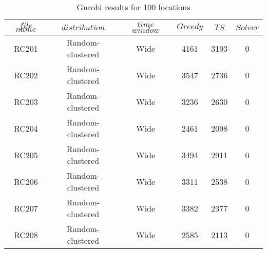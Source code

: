 \begin{table}[t]
\centering
\caption{
Gurobi results for 100 locations}
\begin{tabular*}{0.8\linewidth}{@{\extracolsep{\fill}}cccccc}
\toprule
$file$ $name$ & $distribution$ & $time$ $window$ & $Greedy$ & $TS$ & $Solver$ \\ \midrule
RC201 & Random-clustered & Wide & 4161 & 3193 & 0\\
RC202 & Random-clustered & Wide & 3547 & 2736 & 0\\
RC203 & Random-clustered & Wide & 3236 & 2630 & 0\\
RC204 & Random-clustered & Wide & 2461 & 2098 & 0\\
RC205 & Random-clustered & Wide & 3494 & 2911 & 0\\
RC206 & Random-clustered & Wide & 3311 & 2538 & 0\\
RC207 & Random-clustered & Wide & 3382 & 2377 & 0\\
RC208 & Random-clustered & Wide & 2585 & 2113 & 0\\
\end{tabular*}\end{table}